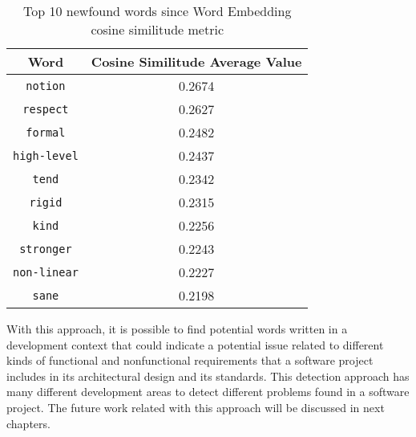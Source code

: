 \begin{table}[H]
    \centering
    \begin{tabular}{|c|c|}
    \hline
       Word  & Cosine Similitude Average Value \\
       \hline
        \texttt{notion} & 0.2674 \\
        \hline
        \texttt{respect} & 0.2627 \\
        \hline
        \texttt{formal} & 0.2482 \\
        \hline
        \texttt{high-level} & 0.2437 \\
        \hline
        \texttt{tend} & 0.2342 \\
        \hline
        \texttt{rigid} & 0.2315 \\
        \hline
        \texttt{kind} & 0.2256 \\
        \hline
        \texttt{stronger} & 0.2243 \\
        \hline
        \texttt{non-linear} & 0.2227 \\
        \hline
        \texttt{sane} & 0.2198 \\
        \hline
    \end{tabular}
    \caption{Top 10 newfound words since Word Embedding cosine similitude metric}
    \label{tab:my_label}
\end{table}

With this approach, it is possible to find potential words written in a development context that could indicate a potential issue related to different kinds of functional and nonfunctional requirements that a software project includes in its architectural design and its standards. This detection approach has many different development areas to detect different problems found in a software project. The future work related with this approach will be discussed in next chapters.
\endinput